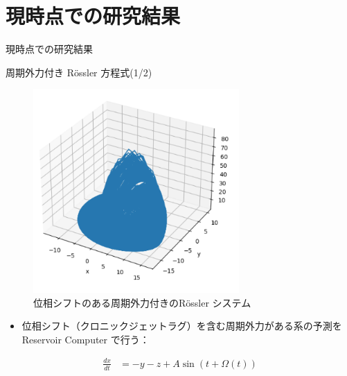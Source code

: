 \section{現時点での研究結果}

\begin{frame}
    \begin{center}
        \LARGE 現時点での研究結果
    \end{center}
\end{frame}

\begin{frame}{周期外力付き Rössler 方程式(1/2)}        
    \begin{minipage}{0.4\textwidth}
            \begin{figure}
                \includegraphics[width=0.7\textwidth]{Fig/Rossler_attractor.png}
                \caption{位相シフトのある周期外力付きのRössler システム}
                \label{rossler_attractor.png} %
            \end{figure}
            \vspace{-.7cm}
            \begin{itemize}
                \item 位相シフト（クロニックジェットラグ）を含む周期外力がある系の予測を Reservoir Computer で行う：
            \end{itemize}
        \end{minipage}
    \begin{minipage}{0.59\textwidth}
        \vspace{-.5cm}
        \begin{align}
            \frac{dx}{dt} &= -y - z + A \sin(t + \Omega(t))\\

\end{align}
\end{minipage}
\end{frame}

